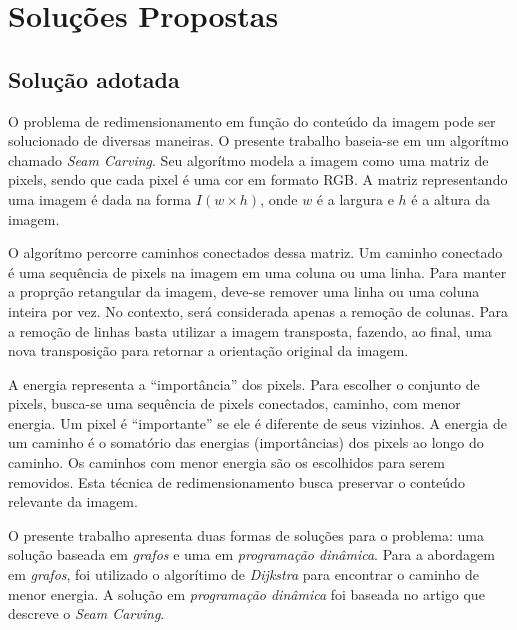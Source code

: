 \section{Soluções Propostas}

\subsection{Solução adotada}
\label{sol:intro}

O problema de redimensionamento em função do conteúdo da imagem 
pode ser solucionado de diversas maneiras. O presente trabalho 
baseia-se em um algorítmo chamado \emph{Seam Carving}\cite{shai2007seam}. 
Seu algorítmo modela a imagem como uma matriz de pixels, 
sendo que cada pixel é uma cor em formato RGB. 
A matriz representando uma imagem é dada na forma 
$I(w \times h)$, onde $w$ é a largura e $h$ é a altura da imagem. 

O algorítmo percorre caminhos conectados dessa matriz. 
Um caminho conectado é uma sequência de pixels na imagem em uma 
coluna ou uma linha. 
Para manter a proprção retangular da imagem,
deve-se remover uma linha ou uma coluna inteira por vez. 
No contexto, será considerada apenas a remoção de colunas.
Para a remoção de linhas basta utilizar a imagem transposta,
fazendo, ao final, uma nova transposição para retornar a orientação
original da imagem.

A energia representa a ``importância'' dos pixels. 
Para escolher o conjunto de pixels,
busca-se uma sequência de pixels conectados, caminho, com menor energia.
Um pixel é ``importante'' se ele é diferente de seus vizinhos. 
A energia de um caminho é o somatório das energias
(importâncias) dos pixels ao longo do caminho. 
Os caminhos com menor energia são os escolhidos para serem removidos. 
Esta técnica de redimensionamento busca 
preservar o conteúdo relevante da imagem.

O presente trabalho apresenta duas formas de soluções para o problema:
uma solução baseada em \emph{grafos} e uma em \emph{programação dinâmica}. 
Para a abordagem em \emph{grafos}, foi utilizado o algorítimo de 
\emph{Dijkstra} para encontrar o caminho de menor energia. 
A solução em \emph{programação dinâmica} foi baseada no artigo
que descreve o \emph{Seam Carving}\citep{shai2007seam}.




